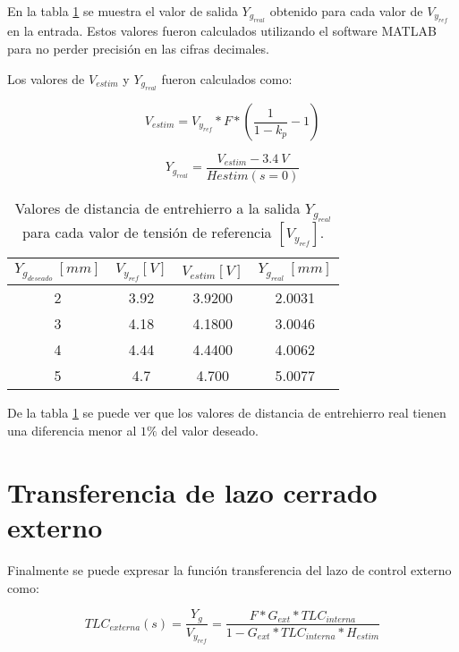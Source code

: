 En la tabla \ref{tension-ref-vs-separacion-real} se muestra el valor de salida $Y_{g_{real}}$ obtenido para cada valor de $V_{y_{ref}}$ en la entrada. Estos valores fueron calculados utilizando el software MATLAB para no perder precisión en las cifras decimales.

Los valores de $V_{estim}$ y $Y_{g_{real}}$ fueron calculados como:

\begin{equation}
	V_{estim}=V_{y_{ref}}*F*(\frac{1}{1-k_p}-1)
\end{equation}

\begin{equation}
	Y_{g_{real}}=\frac{V_{estim}-3.4\:V}{H{estim}(s=0)}
\end{equation}

\begin{table}[H]
	\begin{center}
		\begin{tabular}{| c | c | c | c |}
			\hline
			$Y_{g_{deseado}}\:[mm]$ & $V_{y_{ref}}[V]$& $V_{estim}[V]$& $Y_{g_{real}}\:[mm]$\\ \hline
			2 &	3.92 & 3.9200 & 2.0031 \\ \hline
			3 & 4.18 & 4.1800 & 3.0046\\ \hline
			4 & 4.44 & 4.4400 & 4.0062 \\ \hline
			5 & 4.7 & 4.700 & 5.0077\\ \hline	
		\end{tabular}
		\caption{Valores de distancia de entrehierro a la salida $Y_{g_{real}}$ para cada valor de tensión de referencia $[V_{y_{ref}}]$.}
		\label{tension-ref-vs-separacion-real}
	\end{center}
\end{table}

De la tabla \ref{tension-ref-vs-separacion-real} se puede ver que los valores de distancia de entrehierro real tienen una diferencia menor al $1\%$ del valor deseado.



\section{Transferencia de lazo cerrado externo}

Finalmente se puede expresar la función transferencia del lazo de control externo como:

\begin{equation}
	TLC_{externa}(s)=\frac{Y_g}{V_{y_{ref}}}=\frac{F*G_{ext}*TLC_{interna}}{1-G_{ext}*TLC_{interna}*H_{estim}}
\end{equation}

